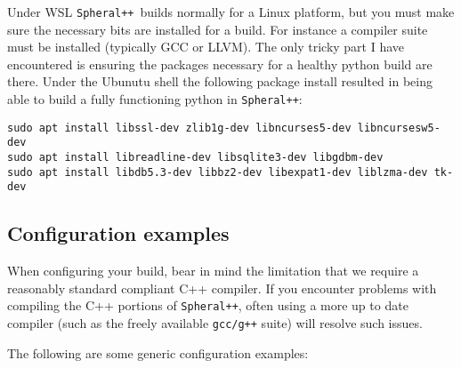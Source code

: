 \documentclass{article}
\newcommand{\Spheral}{{\tt Spheral++}}
\begin{document}
Under WSL \Spheral\ builds normally for a Linux platform, but you must make sure the necessary bits are installed for a build.  For instance a compiler suite must be installed (typically GCC or LLVM).  The only tricky part I have encountered is ensuring the packages necessary for a healthy python build are there.  Under the Ubunutu shell the following package install resulted in being able to build a fully functioning python in \Spheral:
\begin{verbatim}
sudo apt install libssl-dev zlib1g-dev libncurses5-dev libncursesw5-dev 
sudo apt install libreadline-dev libsqlite3-dev libgdbm-dev 
sudo apt install libdb5.3-dev libbz2-dev libexpat1-dev liblzma-dev tk-dev
\end{verbatim}

\subsection{Configuration examples}
When configuring your build, bear in mind the limitation that we require a reasonably standard compliant C++ compiler.  If you encounter problems with compiling the C++ portions of \Spheral, often using a more up to date compiler (such as the freely available \verb.gcc/g++. suite) will resolve such issues.

The following are some generic configuration examples:
\end{document}
